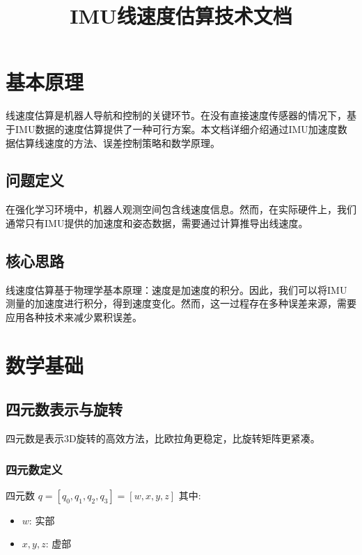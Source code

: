 \documentclass[12pt,a4paper]{article}
\title{IMU线速度估算技术文档}
\author{}
\date{}
\begin{document}
\maketitle

\section{基本原理}

线速度估算是机器人导航和控制的关键环节。在没有直接速度传感器的情况下，基于IMU数据的速度估算提供了一种可行方案。本文档详细介绍通过IMU加速度数据估算线速度的方法、误差控制策略和数学原理。

\subsection{问题定义}

在强化学习环境中，机器人观测空间包含线速度信息。然而，在实际硬件上，我们通常只有IMU提供的加速度和姿态数据，需要通过计算推导出线速度。

\subsection{核心思路}

线速度估算基于物理学基本原理：速度是加速度的积分。因此，我们可以将IMU测量的加速度进行积分，得到速度变化。然而，这一过程存在多种误差来源，需要应用各种技术来减少累积误差。

\section{数学基础}

\subsection{四元数表示与旋转}

四元数是表示3D旋转的高效方法，比欧拉角更稳定，比旋转矩阵更紧凑。

\subsubsection{四元数定义}

四元数 $q = [q_0, q_1, q_2, q_3] = [w, x, y, z]$ 其中:
\begin{itemize}
    \item $w$: 实部
    \item $x, y, z$: 虚部
\end{itemize}
\end{document}
